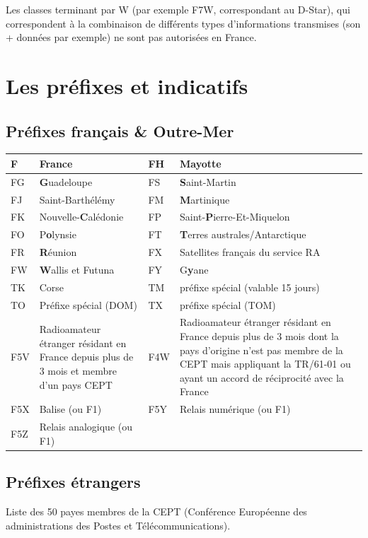 \documentclass[a4paper,12pt,oneside]{report} %
\begin{document}
		Les classes terminant par W (par exemple F7W, correspondant au D-Star), qui correspondent à la combinaison de différents types d'informations transmises (son + données par exemple) ne sont pas autorisées en France.
		
		\section{Les préfixes et indicatifs}
			\subsection{Préfixes français \& Outre-Mer}
			\begin{center}
			\begin{longtable}{|L{1cm}|L{6.1cm}||L{1cm}|L{6.1cm}|}
			\hline
			F & France & 				FH & Mayotte \tabularnewline
			\hline
			FG & \textbf{G}uadeloupe &	FS & \textbf{S}aint-Martin \tabularnewline
			\hline
			FJ & Saint-Barthélémy &		FM & \textbf{M}artinique \tabularnewline
			\hline
			FK & Nouvelle-\textbf{C}alédonie & FP & Saint-\textbf{P}ierre-Et-Miquelon \tabularnewline
			\hline
			FO & P\textbf{o}lynsie &	FT & \textbf{T}erres australes/Antarctique \tabularnewline
			\hline
			FR & \textbf{R}éunion &		FX & Satellites français du service RA \tabularnewline
			\hline
			FW & \textbf{W}allis et Futuna & FY & G\textbf{y}ane \tabularnewline
			\hline
			TK & Corse &				TM & préfixe spécial (valable 15 jours) \tabularnewline
			\hline
			TO & Préfixe spécial (DOM) & TX & préfixe spécial (TOM)\tabularnewline
			\hline
			\hline
			F5V & Radioamateur étranger résidant en France depuis plus de 3 mois et membre d'un pays CEPT & F4W & Radioamateur étranger résidant en France depuis plus de 3 mois dont la pays d'origine n'est pas membre de la CEPT mais appliquant la TR/61-01 ou ayant un accord de réciprocité avec la France \tabularnewline
			\hline
			F5X & Balise (ou F1) &		F5Y & Relais numérique (ou F1) \tabularnewline
			\hline
			F5Z & Relais analogique (ou F1) && \tabularnewline
			\hline
			\end{longtable}
			\end{center}
			
			\subsection{Préfixes étrangers}
			Liste des 50 payes membres de la CEPT (Conférence Européenne des administrations des Postes et Télécommunications).
			
\end{document}

